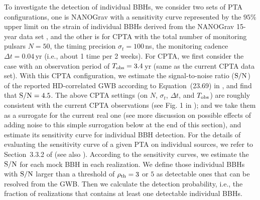 \documentclass[twocolumn]{aastex631}
\newcommand{\snr}{{\rm S/N}}
\newcommand{\rhoth}{{\rho_{\rm th}}}
\begin{document}
To investigate the detection of individual BBHs, we consider two sets of PTA
configurations, 
one is NANOGrav with a sensitivity curve represented by the $95\%$ upper limit
on the strain of individual BBHs derived from the NANOGrav 15-year data set
\citep{NG23indv}, and the other is for CPTA with the total number of monitoring
pulsars $N=50$, the timing precision $\sigma_t=100$\,ns, the monitoring cadence
$\Delta t=0.04$\,yr (i.e., about 1 time per 2 weeks).
For CPTA, we first consider the case with an observation
period of $T_{\rm obs}=3.4$\,yr (same as the current CPTA data set). With this
CPTA configuration, we estimate the signal-to-noise ratio ($\snr$) of the
reported HD-correlated GWB according to Equation~(23.69) in
\citet[][]{Maggiore18}, and find that $\snr=4.5$. 
%
The above CPTA settings (on $N$, $\sigma_t$, $\Delta t$, and $T_{\rm obs}$)
are roughly
consistent with the current CPTA observations (see Fig. 1 in \citealt{CPTA23hd});
and we take them as a surrogate for the current
real one (see more discussion on possible effects of adding noise to this
simple
surrogation below at the end of this section), and estimate its sensitivity
curve for individual BBH detection.
For the details of evaluating the
sensitivity curve of a given PTA on individual sources, we refer to
Section~3.3.2 of \citet{CYL23cgws} (see also
\citealt{Moore15pta, GLY22nf}). 
According to the sensitivity curves, we estimate
the $\snr$ for each mock BBH in each realization. We define those individual
BBHs with $\snr$ larger than a threshold of $\rhoth=3$ or $5$ as detectable ones
that can be resolved from the GWB. Then we calculate the detection probability,
i.e., the fraction of realizations that contains at least one detectable
individual BBHs.
%
\end{document}
